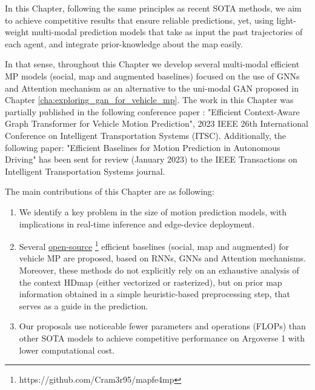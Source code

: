 In this Chapter, following the same principles as recent \ac{SOTA} methods, we aim to achieve competitive results that ensure reliable predictions, yet, using light-weight multi-modal prediction models that take as input the past trajectories of each agent, and integrate prior-knowledge about the map easily.

In that sense, throughout this Chapter we develop several multi-modal efficient \ac{MP} models (social, map and augmented baselines) focused on the use of \acfp{GNN} and Attention mechanism as an alternative to the uni-modal \ac{GAN} proposed in Chapter \ref{cha:exploring_gan_for_vehicle_mp}. The work in this Chapter was partially published in the following conference paper \cite{gomez2023efficientgraphtransformer}: "Efficient Context-Aware Graph Transformer for Vehicle Motion Prediction", 2023 IEEE 26th International Conference on Intelligent Transportation Systems (ITSC). Additionally, the following paper: "Efficient Baselines for Motion Prediction in Autonomous Driving" has been sent for review (January 2023) to the IEEE Transactions on Intelligent Transportation Systems journal.

The main contributions of this Chapter are as following: 

\begin{enumerate}
	
	\item We identify a key problem in the size of motion prediction models, with implications in real-time inference and edge-device deployment.
	
	\item Several \href{https://github.com/Cram3r95/mapfe4mp}{open-source} \footnote{https://github.com/Cram3r95/mapfe4mp} efficient baselines (social, map and augmented) for vehicle \ac{MP} are proposed, based on \acp{RNN}, \acp{GNN} and Attention mechanisms. Moreover, these methods do not explicitly rely on an exhaustive analysis of the context \ac{HDmap} (either vectorized or rasterized), but on prior map information obtained in a simple heuristic-based preprocessing step, that serves as a guide in the prediction.
	
	\item Our proposals use noticeable fewer parameters and operations (\acfp{FLOP}) than other \ac{SOTA} models to achieve competitive performance on Argoverse 1 \cite{chang2019argoverse} with lower computational cost.
	
\end{enumerate} 

